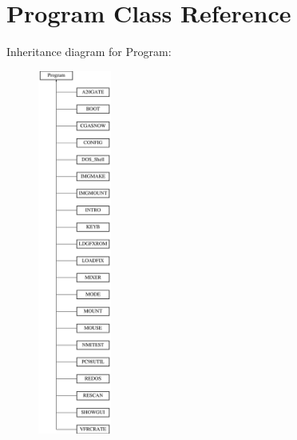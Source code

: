 \hypertarget{classProgram}{\section{Program Class Reference}
\label{classProgram}
}
Inheritance diagram for Program\-:\begin{figure}[H]
\begin{center}
\leavevmode
\includegraphics[height=12.000000cm]{classProgram}
\end{center}
\end{figure}
